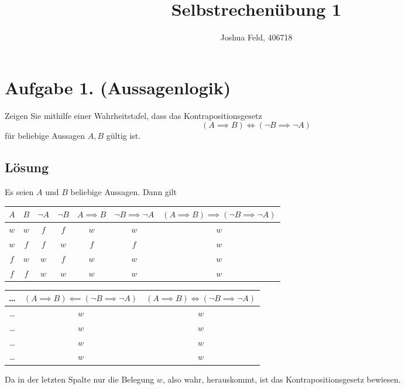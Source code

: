 \documentclass[german,12pt]{homework}
\title{Selbstrechenübung 1}
\author{Joshua Feld, 406718}
\institute{RWTH Aachen University\\Center for Computational Engineering Science}
\begin{document}
    \maketitle

    \section*{Aufgabe 1. (Aussagenlogik)}

    \begin{problem}
        Zeigen Sie mithilfe einer Wahrheitstafel, dass das Kontrapositionsgesetz
        \[\left(A \implies B\right) \iff \left(\lnot{B} \implies
        \lnot{A}\right)\]
        für beliebige Aussagen \(A, B\) gültig ist.
    \end{problem}

    \subsection*{Lösung} Es seien \(A\) und \(B\) beliebige Aussagen. Dann gilt
    \begin{center}
        \begin{tabular}{ccccccc}
            \toprule
            \(A\) & \(B\) & \(\lnot{A}\) & \(\lnot{B}\) & \(A \implies B\) &
            \(\lnot{B} \implies \lnot{A}\) & \(\left(A \implies B\right)
            \implies \left(\lnot{B} \implies \lnot{A}\right)\)\\
            \midrule
            \(w\) & \(w\) & \(f\) & \(f\) & \(w\) & \(w\) & \(w\)\\
            \(w\) & \(f\) & \(f\) & \(w\) & \(f\) & \(f\) & \(w\)\\
            \(f\) & \(w\) & \(w\) & \(f\) & \(w\) & \(w\) & \(w\)\\
            \(f\) & \(f\) & \(w\) & \(w\) & \(w\) & \(w\) & \(w\)\\
            \bottomrule
        \end{tabular}

        \vspace{.2in}

        \begin{tabular}{ccc}
            \toprule
            \ldots & \(\left(A \implies B\right) \impliedby \left(\lnot{B}
            \implies \lnot{A}\right)\) & \(\left(A \implies B\right) \iff
            \left(\lnot{B} \implies \lnot{A}\right)\)\\
            \midrule
            \ldots & \(w\) & \(w\)\\
            \ldots & \(w\) & \(w\)\\
            \ldots & \(w\) & \(w\)\\
            \ldots & \(w\) & \(w\)\\
            \bottomrule
        \end{tabular}
    \end{center}
    Da in der letzten Spalte nur die Belegung \(w\), also wahr, herauskommt,
    ist das Kontrapositionsgesetz bewiesen.
\end{document}
